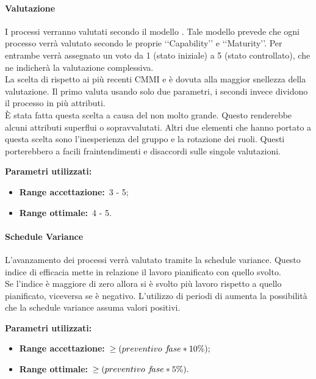 			\paragraph{Valutazione }
				\label{sec:3.7.1.1}
				I processi verranno valutati secondo il modello . Tale modello prevede che ogni processo verrà valutato secondo le proprie ‘‘Capability’’ e ‘‘Maturity’’. Per entrambe verrà assegnato un voto da 1 (stato iniziale) a 5 (stato controllato), che ne indicherà la valutazione complessiva. \\
				La scelta di  rispetto ai più recenti CMMI e  è dovuta alla maggior snellezza della valutazione. Il primo valuta usando solo due parametri, i secondi invece dividono il processo in più attributi. \\
				È stata fatta questa scelta a causa del  non molto grande. Questo renderebbe alcuni attributi superflui o sopravvalutati. Altri due elementi che hanno portato a questa scelta sono l'inesperienza del gruppo e la rotazione dei ruoli. Questi porterebbero a facili fraintendimenti e disaccordi sulle singole valutazioni.
				
				\textbf{Parametri utilizzati:}
				\begin{itemize}
					\item \textbf{Range accettazione:}\ 3 - 5;
					\item \textbf{Range ottimale:}\ 4 - 5.
				\end{itemize}
			\paragraph{Schedule Variance}
				L'avanzamento dei processi verrà valutato tramite la schedule variance. Questo indice di efficacia mette in relazione il lavoro pianificato con quello svolto. \\
				Se l'indice è maggiore di zero allora si è svolto più lavoro rispetto a quello pianificato, viceversa se è negativo. L'utilizzo di periodi di  aumenta la possibilità che la schedule variance assuma valori positivi.
				
				\textbf{Parametri utilizzati:}
				\begin{itemize}
					\item \textbf{Range accettazione:}\ $\ge\-(preventivo\,\, f\!ase*10\%);$
					\item \textbf{Range ottimale:}\ $\ge\-(preventivo\,\, f\!ase*5\%).$
				\end{itemize}
				\label{sec:3.7.1.2}
